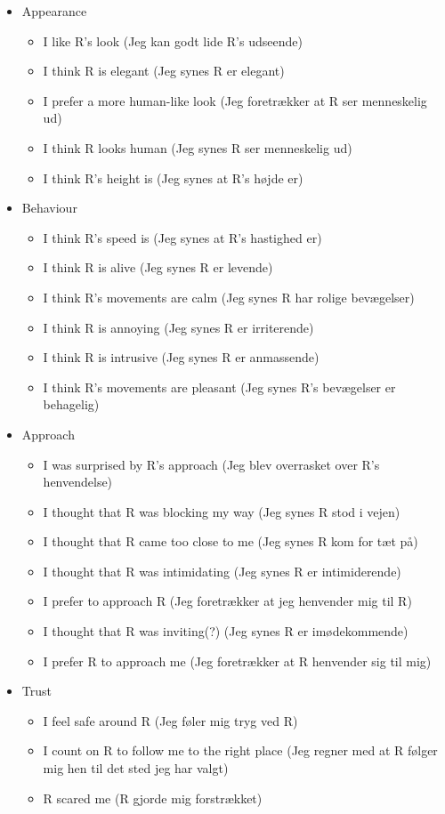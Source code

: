 \begin{itemize}
\item Appearance 
  \begin{itemize}
  \item I like R's look (Jeg kan godt lide R's udseende)
  \item I think R is elegant (Jeg synes R er elegant)
  \item I prefer a more human-like look (Jeg foretrækker at R ser menneskelig ud)
  \item I think R looks human (Jeg synes R ser menneskelig ud)
  \item I think R's height is (Jeg synes at R's højde er)
\end{itemize}
\item Behaviour
  \begin{itemize}
  \item I think R's speed is (Jeg synes at R's hastighed er)
  \item I think R is alive (Jeg synes R er levende)
  \item I think R's movements are calm (Jeg synes R har rolige bevægelser)
  \item I think R is annoying (Jeg synes R er irriterende)
  \item I think R is intrusive (Jeg synes R er anmassende)
  \item I think R's movements are pleasant (Jeg synes R's bevægelser er behagelig)
\end{itemize}
\item Approach 
\begin{itemize}
  \item I was surprised by R's approach (Jeg blev overrasket over R's henvendelse)
  \item I thought that R was blocking my way (Jeg synes R stod i vejen) 
  \item I thought that R came too close to me (Jeg synes R kom for tæt på)
  \item I thought that R was intimidating (Jeg synes R er intimiderende)
  \item I prefer to approach R (Jeg foretrækker at jeg henvender mig til R)
  \item I thought that R was inviting(?) (Jeg synes R er imødekommende)
  \item I prefer R to approach me (Jeg foretrækker at R henvender sig til mig) 
\end{itemize}
\item Trust
\begin{itemize}
  \item I feel safe around R (Jeg føler mig tryg ved R)
  \item I count on R to follow me to the right place (Jeg regner med at R følger mig hen til det sted jeg har valgt) 
  \item R scared me (R gjorde mig forstrækket)\\
\end{itemize}
\end{itemize}
